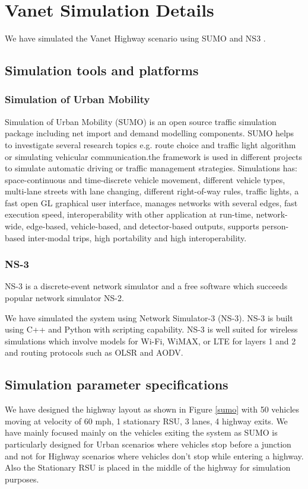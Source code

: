 \documentclass{acm_proc_article-sp}
\begin{document}
\section{Vanet Simulation Details}
\vspace{1 mm}

We have simulated the Vanet Highway scenario using SUMO and NS3 \cite{sumons3}.   

\subsection{Simulation tools and platforms}
\vspace{1 mm}
\subsubsection{Simulation of Urban Mobility}
\vspace{1 mm}
Simulation of Urban Mobility (SUMO) \cite{sumo} is an open source traffic simulation package including net import and demand modelling components. SUMO helps to investigate several research topics e.g. route choice and traffic light algorithm or simulating vehicular communication.the framework is used in different projects to simulate automatic driving or traffic management strategies. Simulations has: space-continuous and time-discrete vehicle movement, different vehicle types, multi-lane streets with lane changing, different right-of-way rules, traffic lights, a fast open GL graphical user interface, manages networks with several edges, fast execution speed, interoperability with other application at run-time, network-wide, edge-based, vehicle-based, and detector-based outputs, supports person-based inter-modal trips, high portability and high interoperability.

\subsubsection{NS-3}
\vspace{1 mm}
NS-3  \cite{ns} is a discrete-event network simulator and a free software which succeeds popular network simulator NS-2.

We have simulated the system using Network Simulator-3 (NS-3). NS-3 is built using C++ and Python with scripting capability. NS-3 is well suited for wireless simulations which involve models for Wi-Fi, WiMAX, or LTE for layers 1 and 2 and routing protocols such as OLSR and AODV.

\subsection{Simulation parameter specifications}
\vspace{1 mm}
We have designed the highway layout  as shown in Figure \ref{sumo} with 50 vehicles moving at velocity of 60 mph, 1 stationary RSU, 3 lanes, 4 highway exits. We have mainly focused mainly on the vehicles exiting the system as SUMO is particularly designed for Urban scenarios where vehicles stop before a junction and not for Highway scenarios where vehicles don't stop while entering a highway. Also the Stationary RSU is placed in the middle of the highway for simulation purposes. 
\end{document}
